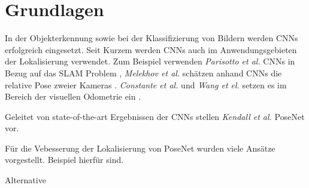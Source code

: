 \pagebreak
\section{Grundlagen}





\pagebreak
In der Objekterkennung \cite{girshickRichFeatureHierarchies2013, girshickFastRCNN2015} sowie bei der Klassifizierung von Bildern \cite{krizhevskyImageNetClassificationDeep2012, heDeepResidualLearning2015} werden CNNs erfolgreich eingesetzt.
Seit Kurzem werden CNNs auch im Anwendungsgebieten der Lokalisierung verwendet. Zum Beispiel verwenden \textit{Parisotto et al.} CNNs in Bezug auf das SLAM Problem \cite{parisottoGlobalPoseEstimation2018}, \textit{Melekhov et al.} schätzen anhand CNNs die relative Pose zweier Kameras \cite{melekhovRelativeCameraPose2017}. \textit{Constante et al.} und \textit{Wang et el.} setzen es im Bereich der visuellen Odometrie ein \cite{costanteExploringRepresentationLearning2016, wangDeepVOEndtoendVisual2017}.

Geleitet von state-of-the-art Ergebnissen der CNNs stellen \textit{Kendall et al.} PoseNet vor.

Für die Vebesserung der Lokalisierung von PoseNet wurden viele Ansätze vorgestellt. Beispiel hierfür sind.



Alternative 


% 
